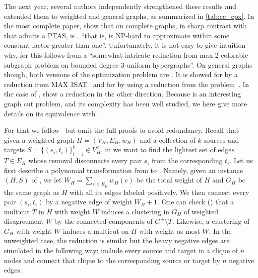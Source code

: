 The next year, several authors independently strengthened these results and extended them to
weighted and general graphs, as summarized in \autoref{tab:cc_cpx}. In the most complete paper,
\textcite{Charikar2003} show that on complete graphs, in sharp contrast with \maxa{} that admits a
PTAS, \mind{} is \APXh{}, \enquote{that is, is NP-hard to approximate within some constant factor
greater than one}. Unfortunately, it is not easy to give intuition why, for this follows from a
\enquote{somewhat intricate reduction from max 2-colorable subgraph problem on bounded degree
3-uniform hypergraphs}. On general graphs though, both versions of the optimization problem are
\APXh{}. It is showed for \maxa{} by a reduction from MAX 3SAT~\autocite[Theorem 9]{Charikar2003}
and for \mind{} by using a reduction from the \mmc{} problem~\autocite[Theorem 8]{Charikar2003}. In
the case of \mind{}, \textcite{Emanuel2003} show a reduction in the other direction. Because \mmc{}
is an interesting graph cut problem, and its complexity has been well studied, we here give more
details on its equivalence with \pcc{}.

For that we follow~\autocite{Demaine2006} but omit the full proofs to avoid redundancy. Recall that
given a weighted graph $H=(V_H, E_H, w_H)$ and a collection of $k$ sources and targets
$S=\{(s_i,t_i)\}_{i=1}^k \in V_H^2$, in \mmc{} we want to find the lightest set of edges $T\in E_H$
whose removal disconnects every pair $s_i$ from the corresponding $t_i$. Let us first describe a
polynomial transformation from \mmc{} to \pcc{}. Namely, given an instance $(H, S)$ of \mmc{}, we let
$W_H=\sum_{e\in E_H} w_H(e)$ be the total weight of $H$ and $G_H$ be the same graph as $H$ with all
its edges labeled positively. We then connect every pair $(s_i, t_i)$ by a negative edge of weight
$W_H+1$. One can check (\autocite[Theorem 4.7]{Demaine2006}) that a multicut $T$ in $H$ with weight
$W$ induces a clustering in $G_H$ of weighted disagreement $W$ by the connected components of
$G^+\setminus T$. Likewise, a clustering of $G_H$ with weight $W$ induces a multicut on $H$ with
weight as most $W$. In the unweighted case, the reduction is similar but the heavy negative edges
are simulated in the following way: include every source and target in a clique of $n$ nodes and
connect that clique to the corresponding source or target by $n$ negative edges.

